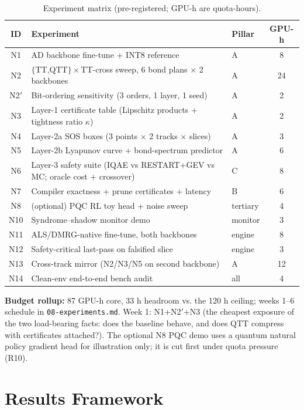 \documentclass[conference,10pt]{IEEEtran}
\begin{document}
\begin{table}[!t]
\caption{Experiment matrix (pre-registered; GPU-h are quota-hours).}
\label{tab:exp}
\centering
\small
\begin{tabular}{@{}cllc@{}}
\toprule
\textbf{ID} & \textbf{Experiment} & \textbf{Pillar} & \textbf{GPU-h} \\
\midrule
N1 & AD backbone fine-tune + INT8 reference & A & 8 \\
N2 & $\{$TT,QTT$\}\times$TT-cross sweep, 6 bond plans $\times$ 2 backbones & A & 24 \\
N2$'$ & Bit-ordering sensitivity (3 orders, 1 layer, 1 seed) & A & 2 \\
N3 & Layer-1 certificate table (Lipschitz products + tightness ratio $\kappa$) & A & 2 \\
N4 & Layer-2a SOS boxes (3 points $\times$ 2 tracks $\times$ slices) & A & 3 \\
N5 & Layer-2b Lyapunov curve + bond-spectrum predictor & A & 6 \\
N6 & Layer-3 safety suite (IQAE vs RESTART+GEV vs MC; oracle cost + crossover) & C & 8 \\
N7 & Compiler exactness + prune certificates + latency & B & 6 \\
N8 & (optional) PQC RL toy head + noise sweep & tertiary & 4 \\
N10 & Syndrome--shadow monitor demo & monitor & 3 \\
N11 & ALS/DMRG-native fine-tune, both backbones & engine & 8 \\
N12 & Safety-critical last-pass on falsified slice & engine & 3 \\
N13 & Cross-track mirror (N2/N3/N5 on second backbone) & A & 12 \\
N14 & Clean-env end-to-end bench audit & all & 4 \\
\bottomrule
\end{tabular}
\end{table}

\textbf{Budget rollup:} 87 GPU-h core, 33 h headroom vs. the 120 h ceiling;
weeks 1--6 schedule in \texttt{08-experiments.md}. Week 1: N1+N2$'$+N3
(the cheapest exposure of the two load-bearing facts: does the baseline behave,
and does QTT compress with certificates attached?). The optional N8 PQC demo
uses a quantum natural policy gradient head \cite{qnpg} for illustration only;
it is cut first under quota pressure (R10).

\section{Results Framework}
\label{sec:results}
\end{document}
